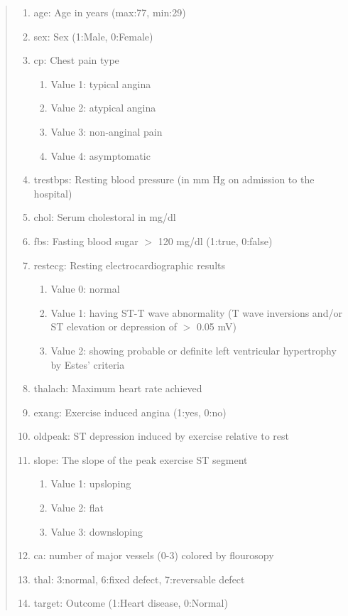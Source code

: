 \documentclass[12pt]{article}
\begin{document}
\begin{quote}
\begin{enumerate}
    \item age: Age in years (max:77, min:29)
    \item sex: Sex (1:Male, 0:Female)
    \item cp: Chest pain type
    \begin{enumerate}
        \item Value 1: typical angina
        \item Value 2: atypical angina 
        \item Value 3: non-anginal pain 
        \item Value 4: asymptomatic 
    \end{enumerate}
    \item trestbps: Resting blood pressure (in mm Hg on admission to the hospital)
    \item chol: Serum cholestoral in mg/dl 
    \item fbs: Fasting blood sugar $>$ 120 mg/dl (1:true, 0:false)
    \item restecg: Resting electrocardiographic results
    \begin{enumerate}
        \item Value 0: normal 
        \item   Value 1: having ST-T wave abnormality (T wave inversions and/or ST elevation or depression of $>$ 0.05 mV)
        \item Value 2: showing probable or definite left ventricular hypertrophy by Estes' criteria 
    \end{enumerate}
    \item thalach: Maximum heart rate achieved
    \item exang: Exercise induced angina (1:yes, 0:no)
    \item oldpeak: ST depression induced by exercise relative to rest
    \item slope: The slope of the peak exercise ST segment
    \begin{enumerate}
        \item Value 1: upsloping 
        \item Value 2: flat 
        \item Value 3: downsloping
    \end{enumerate}
    \item ca: number of major vessels (0-3) colored by flourosopy
    \item thal: 3:normal, 6:fixed defect, 7:reversable defect
    \item target: Outcome (1:Heart disease, 0:Normal)
\end{enumerate}
\end{quote}

\printbibliography
\end{document}
